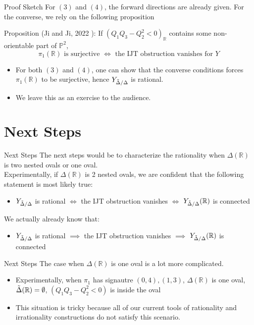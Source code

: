 \documentclass[hyperref, notheorems]{beamer}
\newcommand{\Rbb}{\mathbb{R}}
\newcommand{\Pbb}{\mathbb{P}}
\newcommand{\Ydd}{Y_{\Tilde{\Delta} /\Delta}}
\theoremstyle{definition}
\begin{document}
\begin{frame}{Proof Sketch}
    For $(3)$ and $(4)$, the forward directions are already given. For the converse, we rely on the following proposition 
    \begin{block}{Proposition (Ji and Ji, 2022 \cite{main-paper}):}
        If $(Q_1 Q_3 - Q_2^2 < 0)_{\Rbb}$ contains some non-orientable part of $\Pbb^2$,
        \[\pi_1(\Rbb) \text{ is surjective } \iff \text{ the IJT obstruction vanishes for $Y$}\]
    \end{block}
    \begin{itemize}
        \item For both $(3)$ and $(4)$, one can show that the converse conditions forces $\pi_1(\Rbb)$ to be surjective, hence $\Ydd$ is rational. 
        \item We leave this as an exercise to the audience.
    \end{itemize}
\end{frame}

\section{Next Steps}

\begin{frame}{Next Steps}
   The next steps would be to characterize the rationality when $\Delta(\Rbb)$ is two nested ovals or one oval.\\
   \vspace{\baselineskip}
   Experimentally, if $\Delta(\Rbb)$ is 2 nested ovals, we are confident that the following statement is most likely true:
   \begin{itemize}
       \item $\Ydd$ is rational $\iff$ the IJT obstruction vanishes $\iff$ $\Ydd(\Rbb)$ is connected
   \end{itemize}
   We actually already know that:
   \begin{itemize}
       \item $\Ydd$ is rational $\implies$ the IJT obstruction vanishes $\implies$ $\Ydd(\Rbb)$ is connected
   \end{itemize}
\end{frame}

\begin{frame}{Next Steps}
    The case when $\Delta(\Rbb)$ is one oval is a lot more complicated.
    \begin{itemize}
        \item Experimentally, when $\pi_1$ has signautre $(0, 4), (1, 3)$, $\Delta(\Rbb)$ is one oval, $\Tilde{\Delta}(\Rbb) = \emptyset$, $(Q_1 Q_3 - Q_2^2 < 0)$ is inside the oval
        \item This situation is tricky because all of our current tools of rationality and irrationality constructions do not satisfy this scenario.
    \end{itemize}
\end{frame}
\end{document}
